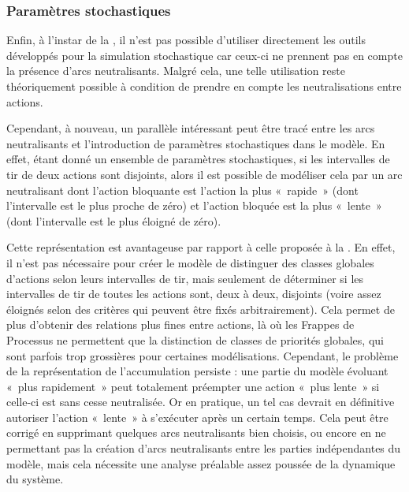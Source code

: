\subsubsection{Paramètres stochastiques}

Enfin, à l'instar de la ,
il n'est pas possible d'utiliser directement les outils développés pour la simulation stochastique
car ceux-ci ne prennent pas en compte la présence d'arcs neutralisants.
Malgré cela, une telle utilisation reste théoriquement possible à condition de prendre
en compte les neutralisations entre actions.

Cependant, à nouveau, un parallèle intéressant peut être tracé entre les arcs neutralisants
et l'introduction de paramètres stochastiques dans le modèle.
En effet, étant donné un ensemble de paramètres stochastiques,
si les intervalles de tir de deux actions sont disjoints,
alors il est possible de modéliser cela par un arc neutralisant
dont l'action bloquante est l'action la plus «~rapide~»
(\cad dont l'intervalle est le plus proche de zéro)
et l'action bloquée est la plus «~lente~»
(\cad dont l'intervalle est le plus éloigné de zéro).

Cette représentation est avantageuse par rapport à celle proposée à la
.
En effet, il n'est pas nécessaire pour créer le modèle
de distinguer des classes globales d'actions selon leurs
intervalles de tir, mais seulement de déterminer si les intervalles de tir de toutes les actions
sont, deux à deux, disjoints (voire assez éloignés selon des critères qui peuvent être
fixés arbitrairement).
Cela permet de plus d'obtenir des relations plus fines entre actions,
là où les Frappes de Processus ne permettent que la distinction de classes de priorités
globales, qui sont parfois trop grossières pour certaines modélisations.
Cependant, le problème de la représentation de l'accumulation persiste :
une partie du modèle évoluant «~plus rapidement~» peut totalement préempter une
action «~plus lente~» si celle-ci est sans cesse neutralisée.
Or en pratique, un tel cas devrait en définitive autoriser l'action «~lente~» à s'exécuter
après un certain temps.
Cela peut être corrigé en supprimant quelques arcs neutralisants bien choisis,
ou encore en ne permettant pas la création d'arcs neutralisants entre les parties indépendantes
du modèle, mais cela nécessite une analyse préalable assez poussée de la dynamique
du système.
